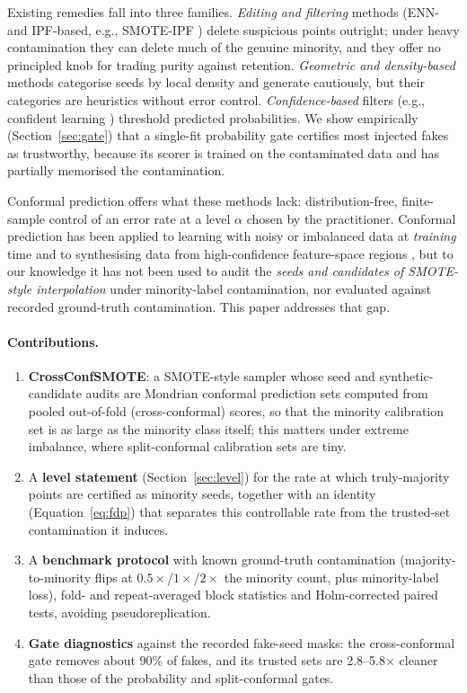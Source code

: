 \documentclass[10pt]{article} %
\begin{document}
Existing remedies fall into three families. \emph{Editing and filtering} methods (ENN- and IPF-based, e.g., SMOTE-IPF \citep{saez2015smoteipf}) delete suspicious points outright; under heavy contamination they can delete much of the genuine minority, and they offer no principled knob for trading purity against retention. \emph{Geometric and density-based} methods \citep{chen2021rsmote, miraj2025gksmote} categorise seeds by local density and generate cautiously, but their categories are heuristics without error control. \emph{Confidence-based} filters (e.g., confident learning \citep{northcutt2021confident}) threshold predicted probabilities. We show empirically (Section~\ref{sec:gate}) that a single-fit probability gate certifies most injected fakes as trustworthy, because its scorer is trained on the contaminated data and has partially memorised the contamination.

Conformal prediction \citep{vovk2005algorithmic} offers what these methods lack: distribution-free, finite-sample control of an error rate at a level $\alpha$ chosen by the practitioner. Conformal prediction has been applied to learning with noisy or imbalanced data at \emph{training} time \citep{grahamknight2024conformal} and to synthesising data from high-confidence feature-space regions \citep{meister2024conformalised}, but to our knowledge it has not been used to audit the \emph{seeds and candidates of SMOTE-style interpolation} under minority-label contamination, nor evaluated against recorded ground-truth contamination. This paper addresses that gap.

\paragraph{Contributions.}
\begin{enumerate}
\item \textbf{CrossConfSMOTE}: a SMOTE-style sampler whose seed and synthetic-candidate audits are Mondrian conformal prediction sets computed from pooled out-of-fold (cross-conformal) scores, so that the minority calibration set is as large as the minority class itself; this matters under extreme imbalance, where split-conformal calibration sets are tiny.
\item A \textbf{level statement} (Section~\ref{sec:level}) for the rate at which truly-majority points are certified as minority seeds, together with an identity (Equation~\ref{eq:fdp}) that separates this controllable rate from the trusted-set contamination it induces.
\item A \textbf{benchmark protocol} with known ground-truth contamination (majority-to-minority flips at $0.5\times$/$1\times$/$2\times$ the minority count, plus minority-label loss), fold- and repeat-averaged block statistics and Holm-corrected paired tests, avoiding pseudoreplication.
\item \textbf{Gate diagnostics} against the recorded fake-seed masks: the cross-conformal gate removes about 90\% of fakes, and its trusted sets are 2.8--5.8$\times$ cleaner than those of the probability and split-conformal gates.
\end{enumerate}
\end{document}
